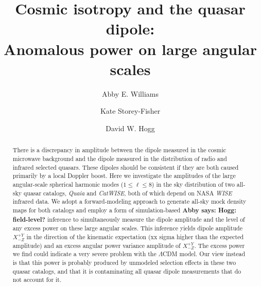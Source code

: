 \documentclass[modern]{aastex631}
\newcommand{\abby}[1]{\textbf{Abby says: #1}}
\newcommand{\catwise}{\textsl{CatWISE}\xspace}
\newcommand{\quaia}{\textsl{Quaia}\xspace}
\newcommand{\wise}{\textsl{WISE}\xspace}
\begin{document}
\title{Cosmic isotropy and the quasar dipole:\\
Anomalous power on large angular scales}
\author[0000-0001-6069-5383]{Abby E. Williams}

\author[0000-0001-8764-7103]{Kate Storey-Fisher}

\author[0000-0003-2866-9403]{David W. Hogg}

\begin{abstract}\noindent %
    There is a discrepancy in amplitude between the dipole measured in the cosmic microwave background and the dipole measured in the distribution of radio and infrared selected quasars.
    These dipoles should be consistent if they are both caused primarily by a local Doppler boost.
    Here we investigate the amplitudes of the large angular-scale spherical harmonic modes ($1\leq\ell\leq 8$) in the sky distribution of two all-sky quasar catalogs, \quaia and \catwise, both of which depend on NASA\! \wise infrared data.
    We adopt a forward-modeling approach to generate all-sky mock density maps for both catalogs and employ a form of simulation-based \abby{Hogg: field-level?} inference to simultaneously measure the dipole amplitude and the level of any excess power on these large angular scales.
    This inference yields dipole amplitude $X^{+Y}_{-Z}$ in the direction of the kinematic expectation (xx sigma higher than the expected amplitude) and an excess angular power variance amplitude of $X^{+Y}_{-Z}$.
    The excess power we find could indicate a very severe problem with the $\Lambda$CDM model.
    Our view instead is that this power is probably produced by unmodeled selection effects in these two quasar catalogs, and that it is contaminating all quasar dipole measurements that do not account for it.
\end{abstract}

\end{document}
